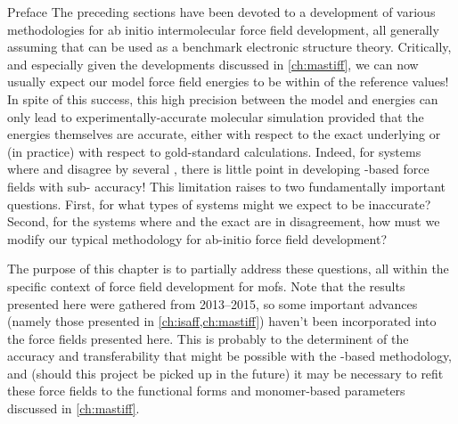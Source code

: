 \begin{section}{Preface}
The preceding sections have been devoted to a development of various methodologies for ab initio intermolecular force
field development, all generally assuming that \sapt can be used as a benchmark electronic structure
theory. Critically, and especially given the developments discussed in
\cref{ch:mastiff},
we can now usually expect our model force field energies to be within
 of the \sapt reference values! In spite of this
success, this high precision between the model
and \sapt energies can only lead to experimentally-accurate molecular simulation provided that the \sapt energies themselves are
accurate, either with respect to the exact underlying \pes or (in
practice)
with respect to gold-standard \ccsdt calculations. Indeed, for systems where \sapt
and \ccsdt disagree by several \kjmol{}, there is little point in developing
\sapt-based force fields with sub-\kjmol{} accuracy! This limitation raises to two
fundamentally important questions. 
First, for what types of systems might we expect \sapt to be inaccurate? Second,
for the systems where \sapt and the exact \pes are in disagreement, how
must we modify our typical methodology for ab-initio force field development?

The purpose of this chapter is to partially address these questions, all
within the specific context of 
force field development for \glspl{mof}. Note that the results presented here were
gathered from 2013--2015, so some important advances (namely those
presented in \cref{ch:isaff,ch:mastiff}) haven't been incorporated into
the force fields presented here. This is probably to the determinent of the accuracy and
transferability that might be possible with the \lmoeda-based methodology, and
(should this project be picked up in the future) it may be necessary to
refit these force fields to the functional forms and monomer-based parameters
discussed in \cref{ch:mastiff}.


\end{section}
